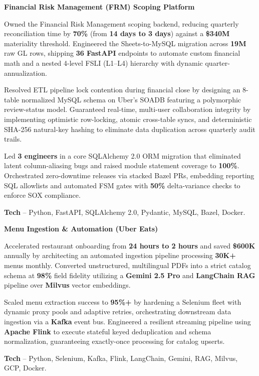 \textcolor{Project}{\textbf{Financial Risk Management (FRM) Scoping Platform}}
\vspace{-0.8ex}
\begin{zitemize}
    \item Owned the Financial Risk Management scoping backend, reducing quarterly reconciliation time by \textbf{70\%} (from \textbf{14 days to 3 days}) against a \textbf{\$340M} materiality threshold. Engineered the Sheets-to-MySQL migration across \textbf{19M} raw GL rows, shipping \textbf{36 FastAPI} endpoints to automate custom financial math and a nested 4-level FSLI (L1--L4) hierarchy with dynamic quarter-annualization.
    \item Resolved ETL pipeline lock contention during financial close by designing an 8-table normalized MySQL schema on Uber's SOADB featuring a polymorphic review-status model. Guaranteed real-time, multi-user collaboration integrity by implementing optimistic row-locking, atomic cross-table syncs, and deterministic SHA-256 natural-key hashing to eliminate data duplication across quarterly audit trails.
    \item Led \textbf{3 engineers} in a core SQLAlchemy 2.0 ORM migration that eliminated latent column-aliasing bugs and raised module statement coverage to \textbf{100\%}. Orchestrated zero-downtime releases via stacked Bazel PRs, embedding reporting SQL allowlists and automated FSM gates with \textbf{50\%} delta-variance checks to enforce SOX compliance.
    \item \textbf{Tech} -- Python, FastAPI, SQLAlchemy 2.0, Pydantic, MySQL, Bazel, Docker.
\end{zitemize}

\textcolor{Project}{\textbf{Menu Ingestion \& Automation (Uber Eats)}}
\vspace{-0.8ex}
\begin{zitemize}
    \item Accelerated restaurant onboarding from \textbf{24 hours to 2 hours} and saved \textbf{\$600K} annually by architecting an automated ingestion pipeline processing \textbf{30K+} menus monthly. Converted unstructured, multilingual PDFs into a strict catalog schema at \textbf{98\%} field fidelity utilizing a \textbf{Gemini 2.5 Pro} and \textbf{LangChain RAG} pipeline over \textbf{Milvus} vector embeddings.
    \item Scaled menu extraction success to \textbf{95\%+} by hardening a Selenium fleet with dynamic proxy pools and adaptive retries, orchestrating downstream data ingestion via a \textbf{Kafka} event bus. Engineered a resilient streaming pipeline using \textbf{Apache Flink} to execute stateful keyed deduplication and schema normalization, guaranteeing exactly-once processing for catalog upserts.
    \item \textbf{Tech} -- Python, Selenium, Kafka, Flink, LangChain, Gemini, RAG, Milvus, GCP, Docker.
\end{zitemize}

